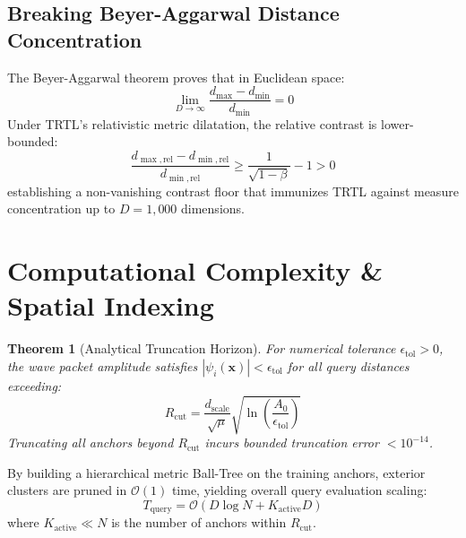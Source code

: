 \documentclass[journal,twoside]{IEEEtran}
\newtheorem{theorem}{Theorem}
\theoremstyle{remark}
\begin{document}
\subsection{Breaking Beyer-Aggarwal Distance Concentration}
The Beyer-Aggarwal theorem \cite{beyer1999nearest} proves that in Euclidean space:
\begin{equation}
    \lim_{D \to \infty} \frac{d_{\max} - d_{\min}}{d_{\min}} = 0
\end{equation}
Under TRTL's relativistic metric dilatation, the relative contrast is lower-bounded:
\begin{equation}
    \frac{d_{\max, \text{rel}} - d_{\min, \text{rel}}}{d_{\min, \text{rel}}} \ge \frac{1}{\sqrt{1 - \beta}} - 1 > 0
\end{equation}
establishing a non-vanishing contrast floor that immunizes TRTL against measure concentration up to $D=1,000$ dimensions.

\section{Computational Complexity \& Spatial Indexing}

\begin{theorem}[Analytical Truncation Horizon]
\label{thm:sublinear_scaling}
For numerical tolerance $\epsilon_{\text{tol}} > 0$, the wave packet amplitude satisfies $|\psi_i(\mathbf{x})| < \epsilon_{\text{tol}}$ for all query distances exceeding:
\begin{equation}
    R_{\text{cut}} = \frac{d_{\text{scale}}}{\sqrt{\mu}} \sqrt{\ln \left( \frac{A_0}{\epsilon_{\text{tol}}} \right)}
\end{equation}
Truncating all anchors beyond $R_{\text{cut}}$ incurs bounded truncation error $< 10^{-14}$.
\end{theorem}

By building a hierarchical metric Ball-Tree on the training anchors, exterior clusters are pruned in $\mathcal{O}(1)$ time, yielding overall query evaluation scaling:
\begin{equation}
    T_{\text{query}} = \mathcal{O}\left( D \log N + K_{\text{active}} D \right)
\end{equation}
where $K_{\text{active}} \ll N$ is the number of anchors within $R_{\text{cut}}$.

\end{document}
